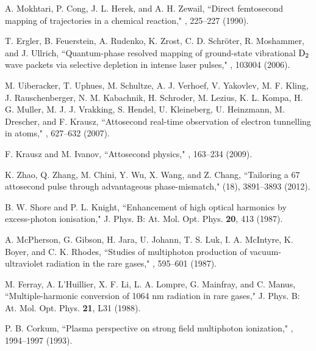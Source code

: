 \documentclass[10pt,letterpaper]{article}
\begin{document}
\begin{thebibliography}{99}
A. Mokhtari, P. Cong, J. L. Herek, and A. H. Zewail, ``Direct femtosecond mapping of trajectories in a chemical reaction," , 225--227 (1990).

T. Ergler, B. Feuerstein, A. Rudenko, K. Zrost, C. D. Schr\"{o}ter, R. Moshammer, and J. Ullrich, ``Quantum-phase resolved mapping of ground-state vibrational ${\rm{D}}_{2}$ wave packets via selective depletion in intense laser pulses," , 103004 (2006).

M. Uiberacker, T. Uphues, M. Schultze, A. J. Verhoef, V. Yakovlev, M. F. Kling, J. Rauschenberger, N. M. Kabachnik, H. Schroder, M. Lezius, K. L. Kompa, H. G. Muller, M. J. J. Vrakking, S. Hendel, U. Kleineberg, U. Heinzmann, M. Drescher, and F. Krausz, ``Attosecond real-time observation of electron tunnelling in atoms," , 627--632 (2007).

F. Krausz and M. Ivanov, ``Attosecond physics," , 163--234 (2009).

K. Zhao, Q. Zhang, M. Chini, Y. Wu, X. Wang, and Z. Chang, ``Tailoring a 67 attosecond pulse through advantageous phase-mismatch," (18), 3891--3893 (2012).

B. W. Shore and P. L. Knight, ``Enhancement of high optical harmonics by excess-photon ionisation," J. Phys. B: At. Mol. Opt. Phys. {\bf 20}, 413 (1987).

A. McPherson, G. Gibson, H. Jara, U. Johann, T. S. Luk, I. A. McIntyre, K. Boyer, and C. K. Rhodes, ``Studies of multiphoton production of vacuum-ultraviolet radiation in the rare gases," , 595--601 (1987).

M. Ferray, A. L'Huillier, X. F. Li, L. A. Lompre, G. Mainfray, and C. Manus, ``Multiple-harmonic conversion of 1064 nm radiation in rare gases," J. Phys. B: At. Mol. Opt. Phys. {\bf 21}, L31 (1988).

P. B. Corkum, ``Plasma perspective on strong field multiphoton ionization," , 1994--1997 (1993).


\end{thebibliography}
\end{document}
